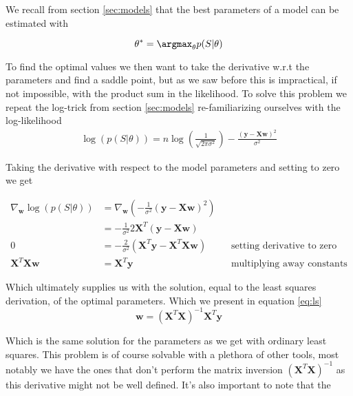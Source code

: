 \noindent We recall from section \ref{sec:models} that the best parameters of a model can be estimated with 

\begin{equation}
\mathbf{\theta}^* = \argmax_\mathbf{\theta} p(S|\mathbf{\theta})
\end{equation}

\noindent To find the optimal values we then want to take the derivative w.r.t the parameters and find a saddle point, but as we saw before this is impractical, if not impossible, with the product sum in the likelihood. To solve this problem we repeat the log-trick from section \ref{sec:models} re-familiarizing ourselves with the log-likelihood
\begin{align}
\log(p(S|\theta)) = n \log(\frac{1}{\sqrt{2\pi \sigma^2}}) - \frac{(\mathbf{y} - \mathbf{X}\mathbf{w})^2}{\sigma^2}
\end{align}

\noindent Taking the derivative with respect to the model parameters and setting to zero we get

\begin{align*}
\nabla_\mathbf{w} \log(p(S|\theta)) &=\nabla_\mathbf{w}\left( - \frac{1}{\sigma^2} (\mathbf{y} - \mathbf{X}\mathbf{w})^2 \right) \\
&= -\frac{1}{\sigma^2} 2 \mathbf{X}^T(\mathbf{y}- \mathbf{X}\mathbf{w}) \\
0 & = -\frac{2}{\sigma^2}(\mathbf{X}^T\mathbf{y} - \mathbf{X}^T\mathbf{Xw})&& \text{setting derivative to zero} \\
\mathbf{X}^T\mathbf{Xw} &= \mathbf{X}^T\mathbf{y}  && \text{multiplying away constants} 
\end{align*}

\noindent Which ultimately supplies us with the solution, equal to the least squares derivation, of the optimal parameters. Which we present in equation \ref{eq:ls}
\begin{equation}\label{eq:ls}
\mathbf{w}= (\mathbf{X}^T \mathbf{X})^{-1}\mathbf{X}^T\mathbf{y} 
\end{equation}


\noindent Which is the same solution for the parameters as we get with ordinary least squares. This problem is of course solvable with a plethora of other tools, most notably we have the ones that don't perform the matrix inversion $(\mathbf{X}^T \mathbf{X})^{-1}$ as this derivative might not be well defined. It's also important to note that the 